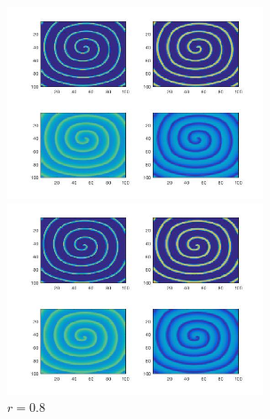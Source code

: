 \documentclass[
pdflinks,
]{xjtuthesis}
\begin{document}
\begin{figure}[!ht]
\begin{minipage}[!ht]{0.5\linewidth}
\centering
\includegraphics[width=3.0in]{figures/p10r0_5_1.jpg}
\caption{$r=0.5$}
\end{minipage}%
\begin{minipage}[!ht]{0.5\linewidth}
\centering
\includegraphics[width=3.0in]{figures/p10r0_8_1.jpg}
\caption{$r=0.8$}
\end{minipage}
\end{figure}
\end{document}
